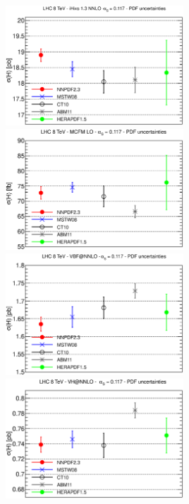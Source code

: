 \documentclass[10pt]{beamer}
\begin{document}
\begin{frame}
     \includegraphics[width=0.5\textwidth]{h8-as0117.eps}
 \includegraphics[width=0.5\textwidth]{h8tt-as0117.eps}\\
     \includegraphics[width=0.5\textwidth]{h8vbf-as0117.eps}
 \includegraphics[width=0.5\textwidth]{h8wh-as0117.eps}


\end{frame}
\end{document}
